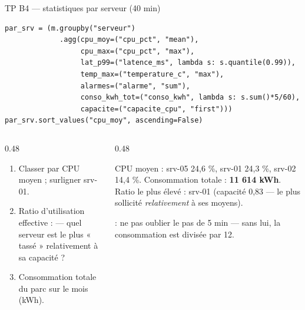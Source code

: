 \begin{frame}[fragile]{TP B4 --- statistiques par serveur (40 min)}
\footnotesize%
\begin{codebox}
\begin{lstlisting}
par_srv = (m.groupby("serveur")
             .agg(cpu_moy=("cpu_pct", "mean"),
                  cpu_max=("cpu_pct", "max"),
                  lat_p99=("latence_ms", lambda s: s.quantile(0.99)),
                  temp_max=("temperature_c", "max"),
                  alarmes=("alarme", "sum"),
                  conso_kwh_tot=("conso_kwh", lambda s: s.sum()*5/60),
                  capacite=("capacite_cpu", "first")))
par_srv.sort_values("cpu_moy", ascending=False)
\end{lstlisting}
\end{codebox}
\begin{columns}[t]
\begin{column}{0.48\textwidth}
\begin{abox}[Exercices]
\begin{enumerate}
\item Classer par CPU moyen ; surligner srv-01.
\item Ratio d'utilisation effective :
 --- quel serveur est le plus
« tassé » relativement à sa capacité ?
\item Consommation totale du parc sur le mois (kWh).
\end{enumerate}
\end{abox}
\end{column}
\begin{column}{0.48\textwidth}
\begin{ebox}
CPU moyen : srv-05 24,6 \%, srv-01 24,3 \%, srv-02 14,4 \%.
Consommation totale : \textbf{11 614 kWh}.
Ratio le plus élevé : srv-01 (capacité 0,83 ---
le plus sollicité \emph{relativement} à ses moyens).
\end{ebox}
\begin{wbox}
 : ne pas oublier le pas de 5 min ---
sans lui, la consommation est divisée par 12.
\end{wbox}
\end{column}
\end{columns}
\end{frame}

